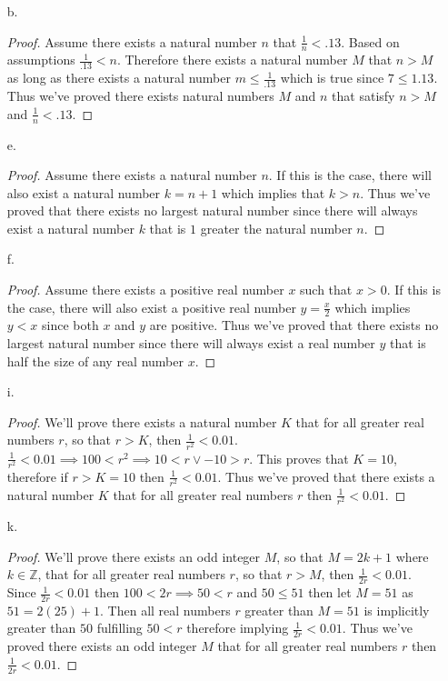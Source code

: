 \documentclass[11pt]{amsart}
\theoremstyle{definition}
\begin{document}
\begin{itemize}
\begin{itemize}
    \item[b.] \begin{proof}
       Assume there exists a natural number $n$ that $\frac 1n <.13$. Based on assumptions $\frac 1{.13}<n$. Therefore there exists a natural number $M$ that $n>M$ as long as there exists a natural number $m\le \frac 1{.13}$ which is true since $7\le 1{.13}$. Thus we've proved there exists natural numbers $M$ and $n$ that satisfy $n>M$ and $\frac 1n < .13$.
    \end{proof}

    \item[e.] \begin{proof}
        Assume there exists a natural number $n$. If this is the case, there will also exist a natural number $k=n+1$ which implies that $k>n$. Thus we've proved that there exists no largest natural number since there will always exist a natural number $k$ that is $1$ greater the natural number $n$.
    \end{proof}

    \item[f.] \begin{proof}
        Assume there exists a positive real number $x$ such that $x>0$. If this is the case, there will also exist a positive real number $y=\frac x2$ which implies $y<x$ since both $x$ and $y$ are positive. Thus we've proved that there exists no largest natural number since there will always exist a real number $y$ that is half the size of any real number $x$.
    \end{proof}

    \item[i.] \begin{proof}
        We'll prove there exists a natural number $K$ that for all greater real numbers $r$, so that $r>K$, then $\frac 1{r^2}<0.01$. $\frac 1{r^2}<0.01\implies 100<r^2\implies 10<r\lor -10>r$. This proves that $K=10$, therefore if $r>K=10$ then $\frac 1{r^2}<0.01$. Thus we've proved that there exists a natural number $K$ that for all greater real numbers $r$ then $\frac 1{r^2}<0.01$.
    \end{proof}

    \item[k.] \begin{proof}
        We'll prove there exists an odd integer $M$, so that $M=2k+1$ where $k\in\mathbb{Z}$, that for all greater real numbers $r$, so that $r>M$, then $\frac1{2r}<0.01$. Since $\frac1{2r}<0.01$ then $100<2r\implies 50<r$ and $50\le51$ then let $M=51$ as $51=2(25)+1$. Then all real numbers $r$ greater than $M=51$ is implicitly greater than $50$ fulfilling $50<r$ therefore implying $\frac1{2r}<0.01$. Thus we've proved there exists an odd integer $M$ that for all greater real numbers $r$ then $\frac1{2r}<0.01$.
    \end{proof}


\end{itemize}
\end{itemize}
\end{document}
